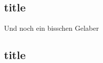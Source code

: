 \documentclass[english,ngerman,ToDo=no]{tudscrman3}
\begin{document}
\subsection{title}
%
\blindtext

Und noch ein bisschen Gelaber
%

\subsection{title}
\Blindtext
\end{document}
